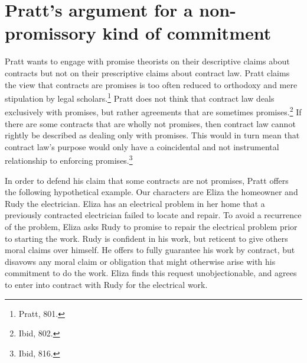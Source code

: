 \section{Pratt's argument for a non-promissory kind of
commitment}

Pratt wants to engage with promise theorists on their descriptive claims
about contracts but not on their prescriptive claims about contract law.
Pratt claims the view that contracts are promises is too often reduced
to orthodoxy and mere stipulation by legal scholars.\footnote{Pratt,
  801.} Pratt does not think that contract law deals exclusively with
promises, but rather agreements that are sometimes promises.\footnote{Ibid,
  802.} If there are some contracts that are wholly not promises, then
contract law cannot rightly be described as dealing only with promises.
This would in turn mean that contract law's purpose would only have a
coincidental and not instrumental relationship to enforcing
promises.\footnote{Ibid, 816.}

In order to defend his claim that some contracts are not promises, Pratt
offers the following hypothetical example. Our characters are Eliza the
homeowner and Rudy the electrician. Eliza has an electrical problem in
her home that a previously contracted electrician failed to locate and
repair. To avoid a recurrence of the problem, Eliza asks Rudy to promise
to repair the electrical problem prior to starting the work. Rudy is
confident in his work, but reticent to give others moral claims over
himself. He offers to fully guarantee his work by contract, but disavows
any moral claim or obligation that might otherwise arise with his
commitment to do the work. Eliza finds this request unobjectionable, and
agrees to enter into contract with Rudy for the electrical work.


